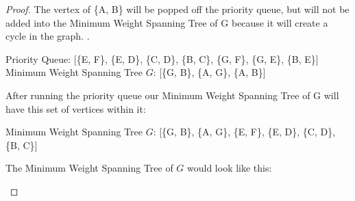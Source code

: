 \documentclass[11pt]{article}
\theoremstyle{definition}
\theoremstyle{definition}
\theoremstyle{definition}
\begin{document}
\begin{proof}
The vertex of \{A, B\} will be popped off the priority queue, but will not be added into the Minimum Weight Spanning Tree of G because it will create a cycle in the graph. . \\
\begin{center}
Priority Queue: [\{E, F\}, \{E, D\}, \{C, D\}, \{B, C\}, \{G, F\}, \{G, E\}, \{B, E\}]\\
Minimum Weight Spanning Tree $G$: [\{G, B\}, \{A, G\}, \{A, B\}] \\
\end{center}

After running the priority queue our Minimum Weight Spanning Tree of G will have this set of vertices within it: \\
\begin{center}
Minimum Weight Spanning Tree $G$: [\{G, B\}, \{A, G\}, \{E, F\}, \{E, D\}, \{C, D\}, \{B, C\}]
\end{center}
The Minimum Weight Spanning Tree of $G$ would look like this:
\begin {center}
\end{center}
\end{proof}


\newpage
\end{document}
